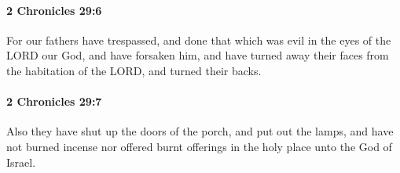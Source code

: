 		\paragraph{2 Chronicles 29:6} %
			\label{2CHRONICLES-29-6}

			For our fathers have trespassed, and done that which was evil in the eyes of the LORD our God, and have forsaken him, and have turned away their faces from the habitation of the LORD, and turned their backs.


		\paragraph{2 Chronicles 29:7} %
			\label{2CHRONICLES-29-7}

			Also they have shut up the doors of the porch, and put out the lamps, and have not burned incense nor offered burnt offerings in the holy place unto the God of Israel.

